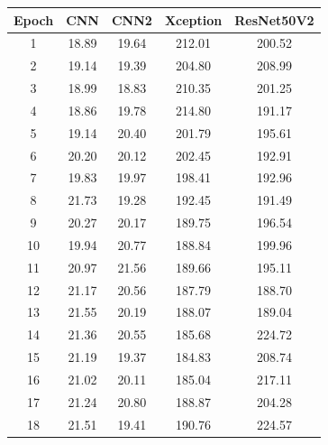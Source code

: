 \begin{table}[!hbt]
	\centering
	\label{tab:training_time}
	\begin{tabular}{|c|c|c|c|c|} 
	\hline
	Epoch & CNN & CNN2 & Xception & ResNet50V2\\
	\hline
	1              & 18.89        & 19.64         & 212.01            & 200.52              \\
	2              & 19.14        & 19.39         & 204.80            & 208.99              \\
	3              & 18.99        & 18.83         & 210.35            & 201.25              \\
	4              & 18.86        & 19.78         & 214.80            & 191.17              \\
	5              & 19.14        & 20.40         & 201.79            & 195.61              \\
	6              & 20.20        & 20.12         & 202.45            & 192.91              \\
	7              & 19.83        & 19.97         & 198.41            & 192.96              \\
	8              & 21.73        & 19.28         & 192.45            & 191.49              \\
	9              & 20.27        & 20.17         & 189.75            & 196.54              \\
	10             & 19.94        & 20.77         & 188.84            & 199.96              \\
	11             & 20.97        & 21.56         & 189.66            & 195.11              \\
	12             & 21.17        & 20.56         & 187.79            & 188.70              \\
	13             & 21.55        & 20.19         & 188.07            & 189.04              \\
	14             & 21.36        & 20.55         & 185.68            & 224.72              \\
	15             & 21.19        & 19.37         & 184.83            & 208.74              \\
	16             & 21.02        & 20.11         & 185.04            & 217.11              \\
	17             & 21.24        & 20.80         & 188.87            & 204.28              \\
	18             & 21.51        & 19.41         & 190.76            & 224.57              \\

\end{tabular}
\end{table}
